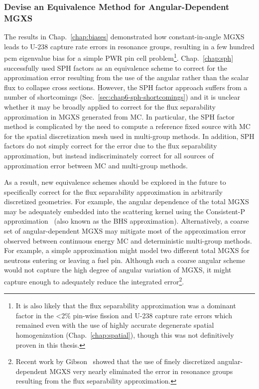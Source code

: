 \subsubsection{Devise an Equivalence Method for Angular-Dependent MGXS}
\label{subsubsec:chap12-angular-dependent-mgxs}

The results in Chap.~\ref{chap:biases} demonstrated how constant-in-angle \ac{MGXS} leads to U-238 capture rate errors in resonance groups, resulting in a few hundred \ac{pcm} eigenvalue bias for a simple \ac{PWR} pin cell problem\footnote{It is also likely that the flux separability approximation was a dominant factor in the <2\% pin-wise fission and U-238 capture rate errors which remained even with the use of highly accurate degenerate spatial homogenization (Chap.~\ref{chap:spatial}), though this was not definitively proven in this thesis.}. Chap.~\ref{chap:sph} successfully used \ac{SPH} factors as an equivalence scheme to correct for the approximation error resulting from the use of the angular rather than the scalar flux to collapse cross sections. However, the \ac{SPH} factor approach suffers from a number of shortcomings (Sec.~\ref{sec:chap6-sph-shortcomings}) and it is unclear whether it may be broadly applied to correct for the flux separability approximation in \ac{MGXS} generated from \ac{MC}. In particular, the \ac{SPH} factor method is complicated by the need to compute a reference fixed source with \ac{MC} for the spatial discretization mesh used in multi-group methods. In addition, \ac{SPH} factors do not simply correct for the error due to the flux separability approximation, but instead indiscriminately correct for all sources of approximation error between \ac{MC} and multi-group methods.

As a result, new equivalence schemes should be explored in the future to specifically correct for the flux separability approximation in arbitrarily discretized geometries. For example, the angular dependence of the total \ac{MGXS} may be adequately embedded into the scattering kernel using the Consistent-P approximation~\cite{bell1967transport} (also known as the BHS approximation). Alternatively, a coarse set of angular-dependent \ac{MGXS} may mitigate most of the approximation error observed between continuous energy \ac{MC} and deterministic multi-group methods. For example, a simple approximation might model two different total \ac{MGXS} for neutrons entering or leaving a fuel pin. Although such a coarse angular scheme would not capture the high degree of angular variation of \ac{MGXS}, it might capture enough to adequately reduce the integrated error\footnote{Recent work by Gibson~\cite{gibson2016thesis} showed that the use of finely discretized angular-dependent \ac{MGXS} very nearly eliminated the error in resonance groups resulting from the flux separability approximation.}. 

